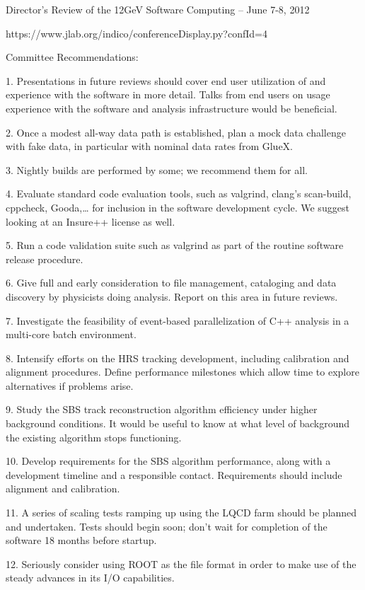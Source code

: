 \documentclass[12pt]{article}
\begin{document}
Director’s Review of the 12GeV Software Computing – June 7-8, 2012

https://www.jlab.org/indico/conferenceDisplay.py?confId=4

Committee Recommendations:

1. Presentations in future reviews should cover end user utilization of and experience with the software in more detail. Talks from end users on usage experience with the software and analysis infrastructure would be beneficial.

2. Once a modest all-way data path is established, plan a mock data challenge with fake data, in particular with nominal data rates from GlueX.

3. Nightly builds are performed by some; we recommend them for all.

4. Evaluate standard code evaluation tools, such as valgrind, clang’s scan-build, cppcheck, Gooda,… for inclusion in the software development cycle. We suggest looking at an Insure++ license as well.

5. Run a code validation suite such as valgrind as part of the routine software release procedure.

6. Give full and early consideration to file management, cataloging and data discovery by physicists doing analysis. Report on this area in future reviews.

7. Investigate the feasibility of event-based parallelization of C++ analysis in a multi-core batch environment.

8. Intensify efforts on the HRS tracking development, including calibration and alignment procedures. Define performance milestones which allow time to explore alternatives if problems arise.

9. Study the SBS track reconstruction algorithm efficiency under higher background conditions. It would be useful to know at what level of background the existing algorithm stops functioning.

10. Develop requirements for the SBS algorithm performance, along with a development timeline and a responsible contact. Requirements should include alignment and calibration.

11. A series of scaling tests ramping up using the LQCD farm should be planned and undertaken. Tests should begin soon; don’t wait for completion of the software 18 months before startup.

12. Seriously consider using ROOT as the file format in order to make use of the steady advances in its I/O capabilities.
\end{document}
